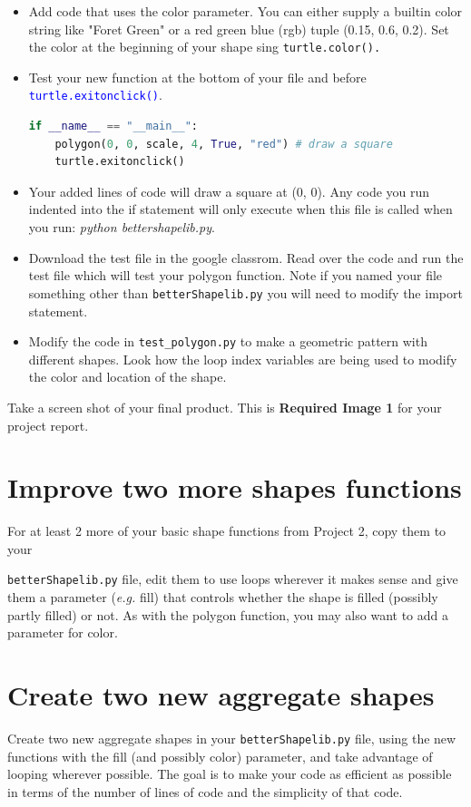 \documentclass[12pt]{article}
\begin{document}
\begin{itemize}
  \item Add code that uses the color parameter. You can either supply a builtin color string like "Foret Green" or a red green blue (rgb) tuple (0.15, 0.6, 0.2). Set the color at the beginning of your shape sing \texttt{turtle.color().}
  \item Test your new function at the bottom of your file and before \textcolor{blue}{\texttt{turtle.exitonclick()}}.
    \begin{lstlisting}[language=Python]
if __name__ == "__main__":
    polygon(0, 0, scale, 4, True, "red") # draw a square
    turtle.exitonclick()
    \end{lstlisting}
  \item Your added lines of code will draw a square at (0, 0). Any code you run indented into the if statement will only execute when this file is called when you run: \textit{python bettershapelib.py}.
  \item Download the test file in the google classrom. Read over the code and run the test file which will test your polygon function. Note if you named your file something other than \texttt{betterShapelib.py} you will need to modify the import statement.
    \item Modify the code in \texttt{test\_polygon.py} to make a geometric pattern with different shapes. Look how the loop index variables are being used to modify the color and location of the shape.
\end{itemize}

Take a screen shot of your final product. This is \textbf{Required Image 1} for your project report.

\section{Improve two more shapes functions}
For at least 2 more of your basic shape functions from Project 2, copy them to your

\texttt{betterShapelib.py} file, edit them to use loops wherever it makes sense and give them a parameter (\textit{e.g.} fill) that controls whether the shape is filled (possibly partly filled) or not. As with the polygon function, you may also want to add a parameter for color.

\section{Create two new aggregate shapes}
Create two new aggregate shapes in your \texttt{betterShapelib.py} file, using the new functions with the fill (and possibly color) parameter, and take advantage of looping wherever possible. The goal is to make your code as efficient as possible in terms of the number of lines of code and the simplicity of that code.
\end{document}
